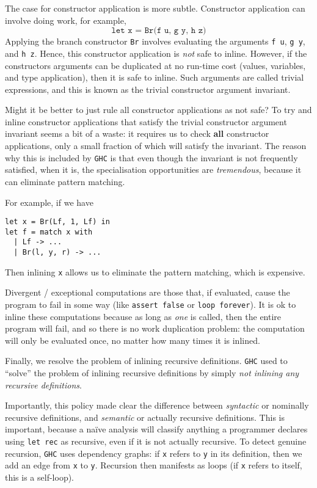 The case for constructor application is more subtle. Constructor application can involve doing work, for example, 
\[\texttt{let x = Br(f u, g y, h z)}\]
Applying the branch constructor \texttt{Br} involves evaluating the arguments \texttt{f u}, \texttt{g y}, and \texttt{h z}. Hence, this constructor application is \textit{not} safe to inline. However, if the constructors arguments can be duplicated at no run-time cost (values, variables, and type application), then it is safe to inline. Such arguments are called trivial expressions, and this is known as the trivial constructor argument invariant. 

Might it be better to just rule all constructor applications as not safe? To try and inline constructor applications that satisfy the trivial constructor argument invariant seems a bit of a waste: it requires us to check \textbf{all} constructor applications, only a small fraction of which will satisfy the invariant. The reason why this is included by \texttt{GHC} is that even though the invariant is not frequently satisfied, when it is, the specialisation opportunities are \textit{tremendous}, because it can eliminate pattern matching. 

For example, if we have 
\begin{verbatim}
let x = Br(Lf, 1, Lf) in
let f = match x with
  | Lf -> ...
  | Br(l, y, r) -> ...
\end{verbatim}
Then inlining \texttt{x} allows us to eliminate the pattern matching, which is expensive. 

Divergent / exceptional computations are those that, if evaluated, cause the program to fail in some way (like \texttt{assert false} or \texttt{loop forever}). It is ok to inline these computations because as long as \textit{one} is called, then the entire program will fail, and so there is no work duplication problem: the computation will only be evaluated once, no matter how many times it is inlined. 

Finally, we resolve the problem of inlining recursive definitions. \texttt{GHC} used to ``solve'' the problem of inlining recursive definitions by simply \textit{not inlining any recursive definitions}. 

Importantly, this policy made clear the difference between \textit{syntactic} or nominally recursive definitions, and \textit{semantic} or actually recursive definitions. This is important, because a naïve analysis will classify anything a programmer declares using \texttt{let rec} as recursive, even if it is not actually recursive. To detect genuine recursion, \texttt{GHC} uses dependency graphs: if \texttt{x} refers to \texttt{y} in its definition, then we add an edge from \texttt{x} to \texttt{y}. Recursion then manifests as loops (if \texttt{x} refers to itself, this is a self-loop).

